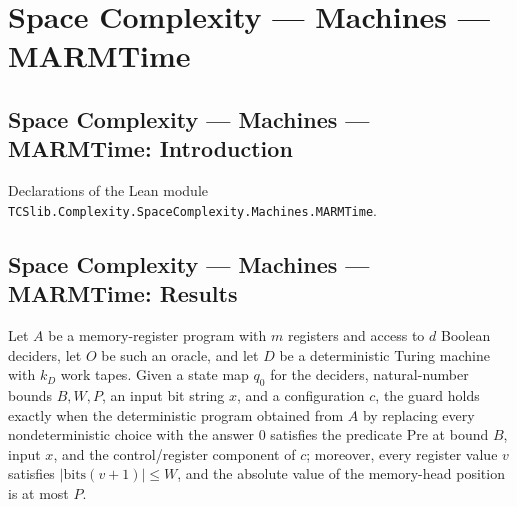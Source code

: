 \section{Space Complexity --- Machines --- MARMTime}
\subsection*{Space Complexity --- Machines --- MARMTime: Introduction}

Declarations of the Lean module \texttt{TCSlib.Complexity.SpaceComplexity.Machines.MARMTime}.

\subsection*{Space Complexity --- Machines --- MARMTime: Results}

\begin{definition}
\label{Complexity.LogProg.MGuard}
\leanok
{}
Let $A$ be a memory-register program with $m$ registers and access to $d$ Boolean
deciders, let $O$ be such an oracle, and let $D$ be a deterministic Turing machine with
$k_D$ work tapes. Given a state map $q_0$ for the deciders, natural-number bounds
$B,W,P$, an input bit string $x$, and a configuration $c$, the guard holds exactly when
the deterministic program obtained from $A$ by replacing every nondeterministic choice
with the answer $0$ satisfies the predicate $\mathrm{Pre}$ at bound $B$, input $x$, and
the control/register component of $c$; moreover, every register value $v$ satisfies
$|\mathrm{bits}(v+1)|\le W$, and the absolute value of the memory-head position is at
most $P$.
\end{definition}

